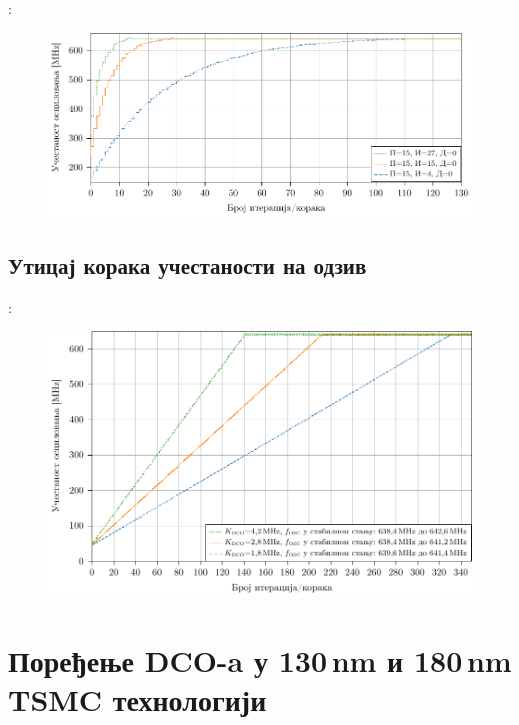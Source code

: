 \documentclass[aspectratio=169]{beamer}
\def \DCO  {DCO} %
\begin{document}
\begin{frame}{\secname: \subsecname}
    \begin{figure}[!t]
	    \centering
	    \includegraphics[scale=0.8]{slike/prezentacija/py_pid_ki_tuning.pdf}
    \end{figure}
\end{frame}

\subsection{Утицај корака учестаности на одзив}

\begin{frame}{\secname: \subsecname}
    \begin{figure}[!t]
	    \centering
	    \includegraphics[scale=0.75]{slike/prezentacija/py_kdco_tuning.pdf}
    \end{figure}
\end{frame}

\section{Поређење \DCO-a у 130\texorpdfstring{\,}{ }nm и 180\texorpdfstring{\,}{ }nm TSMC технологији}
\end{document}
